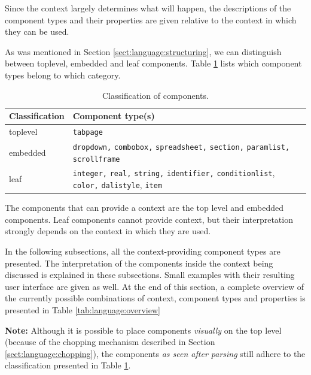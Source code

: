Since the context largely determines what will happen, the descriptions of the
component types and their properties are given relative to the context in which
they can be used.

As was mentioned in Section \ref{sect:language:structuring}, we can distinguish
between toplevel, embedded and leaf components. Table
\ref{tab:language:top_leaf} lists which component types belong to which
category.

\begin{table} \begin{center}
\caption{Classification of components.}
\label{tab:language:top_leaf}
\begin{tabular}{l|p{6cm}}
\hline
 \textsf{Classification} & \textsf{Component type(s)} \\
\hline
toplevel     & \verb=tabpage= \\
embedded     & \verb=dropdown,= \verb=combobox,= \verb=spreadsheet,= \verb=section,= \verb=paramlist,= \verb=scrollframe=  \\
leaf         & \verb=integer,= \verb=real,= \verb=string,= \verb=identifier,= \verb=conditionlist=, \verb=color,= \verb=dalistyle=, \verb=item= \\
\hline
\end{tabular} \end{center} \end{table}

The components that can provide a context are the top level and embedded
components. Leaf components cannot provide context, but their interpretation
strongly depends on the context in which they are used.

\bigskip \noindent
In the following subsections, all the context-providing component types are
presented. The interpretation of the components inside the context being
discussed is explained in these subsections. Small examples with their
resulting user interface are given as well. At the end of this section, a
complete overview of the currently possible combinations of context, component
types and properties is presented in Table \ref{tab:language:overview}

\bigskip \noindent
\textbf{Note:} Although it is possible to place components \emph{visually} on
the top level (because of the chopping mechanism described in Section
\ref{sect:language:chopping}), the components \emph{as seen after parsing}
still adhere to the classification presented in Table
\ref{tab:language:top_leaf}.


